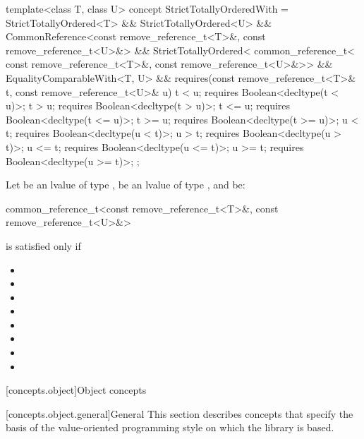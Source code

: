 \begin{itemdecl}
template<class T, class U>
concept StrictTotallyOrderedWith = StrictTotallyOrdered<T> && StrictTotallyOrdered<U> &&
  CommonReference<const remove_reference_t<T>&, const remove_reference_t<U>&> &&
  StrictTotallyOrdered<
    common_reference_t<
      const remove_reference_t<T>&,
      const remove_reference_t<U>&>> &&
  EqualityComparableWith<T, U> &&
  requires(const remove_reference_t<T>& t,
           const remove_reference_t<U>& u) {
    t <  u; requires Boolean<decltype(t <  u)>;
    t >  u; requires Boolean<decltype(t >  u)>;
    t <= u; requires Boolean<decltype(t <= u)>;
    t >= u; requires Boolean<decltype(t >= u)>;
    u <  t; requires Boolean<decltype(u <  t)>;
    u >  t; requires Boolean<decltype(u >  t)>;
    u <= t; requires Boolean<decltype(u <= t)>;
    u >= t; requires Boolean<decltype(u >= t)>;
  };
\end{itemdecl}

\begin{itemdescr}
\pnum
Let  be an lvalue of type ,
 be an lvalue of type ,
and  be:
\begin{codeblock}
common_reference_t<const remove_reference_t<T>&, const remove_reference_t<U>&>
\end{codeblock}
 is satisfied only if

\begin{itemize}
\item {}
\item {}
\item {}
\item {}
\item {}
\item {}
\item {}
\item {}
\end{itemize}
\end{itemdescr}

[concepts.object]{Object concepts}

[concepts.object.general]{General}
\pnum
This section describes concepts that specify the basis of the
value-oriented programming style on which the library is based.

